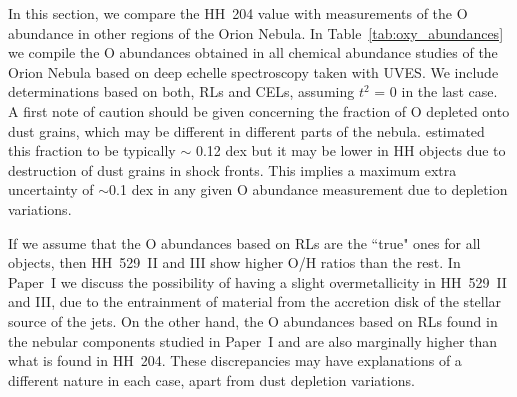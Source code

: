 \documentclass[twocolumn]{aastex63}
\begin{document}
In this section, we compare the HH~204 value with measurements of the O abundance in other regions of the Orion Nebula. 
In Table~\ref{tab:oxy_abundances} we compile the O abundances obtained in all chemical abundance studies of the Orion Nebula based on deep echelle spectroscopy taken with UVES. We include determinations based on both, RLs and CELs, assuming $t^2$ = 0 in the last case. 
A first note of caution should be given concerning the fraction of O depleted onto dust grains,
which may be different in different parts of the nebula. 
\citet{mesadelgado09} estimated this fraction to be typically $\sim$ 0.12 dex but it may be lower in HH objects due to destruction of dust grains in shock fronts. 
This implies a maximum extra uncertainty of $\sim$0.1 dex in any given O abundance measurement due to depletion variations.



If we assume that the O abundances based on RLs are the ``true" ones for all objects, then HH~529~II and III 
show higher O/H ratios than the rest. 
In Paper~I we discuss the possibility of having a slight overmetallicity in HH~529~II and III, due to the entrainment of material from the accretion disk of the stellar source of the jets. On the other hand, the O abundances based on RLs found in the nebular components studied in Paper~I and \citet[][]{Esteban04} are also marginally higher than what is found in HH~204. These discrepancies may have  explanations of a different nature in each case, apart from dust depletion variations.
\end{document}
